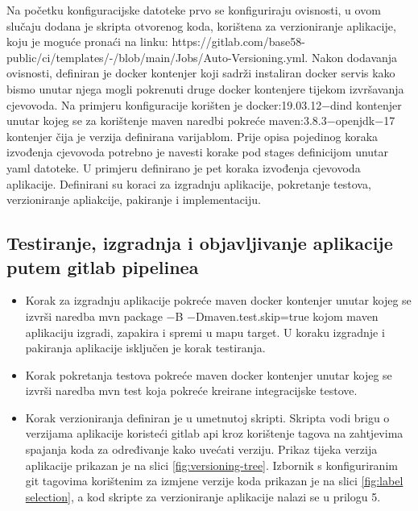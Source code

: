 \documentclass[a4paper,12pt,oneside]{article}
\begin{document}
Na početku konfiguracijske datoteke prvo se konfiguriraju ovisnosti, u ovom slučaju dodana je skripta otvorenog koda, korištena za verzioniranje aplikacije, koju je moguće pronaći na linku: https://gitlab.com/base58-public/ci/templates/-/blob/main/Jobs/Auto-Versioning.yml. Nakon dodavanja ovisnosti, definiran je docker kontenjer koji sadrži instaliran docker servis kako bismo unutar njega mogli pokrenuti druge docker kontenjere tijekom izvršavanja cjevovoda. Na primjeru konfiguracije korišten je docker:19.03.12−dind kontenjer unutar kojeg se za korištenje maven naredbi pokreće maven:3.8.3−openjdk−17 kontenjer čija je verzija definirana varijablom. Prije opisa pojedinog koraka izvođenja cjevovoda potrebno je navesti korake pod stages definicijom unutar yaml datoteke. U primjeru definirano je pet koraka izvođenja cjevovoda aplikacije. Definirani su koraci za izgradnju aplikacije, pokretanje testova, verzioniranje apliakcije, pakiranje i implementaciju. 


\subsection{Testiranje, izgradnja i objavljivanje aplikacije putem gitlab pipelinea}

\begin{itemize}

\item Korak za izgradnju aplikacije pokreće maven docker kontenjer unutar kojeg se izvrši naredba mvn package −B −Dmaven.test.skip=true kojom maven aplikaciju izgradi, zapakira i spremi u mapu target. U koraku izgradnje i pakiranja aplikacije isključen je korak testiranja.

\item Korak pokretanja testova pokreće maven docker kontenjer unutar kojeg se izvrši naredba mvn test koja pokreće kreirane integracijske testove.

\item Korak verzioniranja definiran je u umetnutoj skripti. Skripta vodi brigu o verzijama aplikacije koristeći gitlab api kroz korištenje tagova na zahtjevima spajanja koda za određivanje kako uvećati verziju. Prikaz tijeka verzija aplikacije prikazan je na slici \ref{fig:versioning-tree}. Izbornik s konfiguriranim git tagovima korištenim za izmjene verzije koda prikazan je na slici \ref{fig:label selection}, a kod skripte za verzioniranje aplikacije nalazi se u prilogu 5.
\end{itemize}
\end{document}

